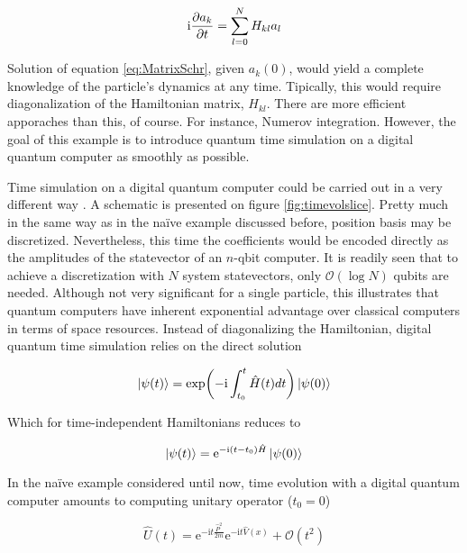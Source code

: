   \begin{equation}
    \mathrm{i}\pdv{a_k}{t} = \sum_{l = 0}^{N} H_{kl} a_l
    \label{eq:MatrixSchr}
  \end{equation}

  Solution of equation \ref{eq:MatrixSchr}, given $a_k(0)$, would yield a complete knowledge of the particle's dynamics at any time. Tipically, this would require diagonalization of the Hamiltonian matrix, $H_{kl}$. There are more efficient apporaches than this, of course. For instance, Numerov integration. However, the goal of this example is to introduce quantum time simulation on a digital quantum computer as smoothly as possible.

  Time simulation on a digital quantum computer could be carried out in a very different way \cite{Strini, Nielsen}. A schematic is presented on figure \ref{fig:timevolslice}. Pretty much in the same way as in the naïve example discussed before, position basis may be discretized. Nevertheless, this time the coefficients would be encoded directly as the amplitudes of the statevector of an $n$-qbit computer. It is readily seen that to achieve a discretization with $N$ system statevectors, only $\mathcal{O}(\log{N})$ qubits are needed. Although not very significant for a single particle, this illustrates that quantum computers have inherent exponential advantage over classical computers in terms of space resources. Instead of diagonalizing the Hamiltonian, digital quantum time simulation relies on the direct solution

  \begin{equation}
    \ket{\psi(t)} = \exp(-\mathrm{i}\int_{t_0}^t \hat{H}(t)dt)\ket{\psi(0)}
    \label{eq:UnitaryEvolution}
  \end{equation}

  Which for time-independent Hamiltonians reduces to

  \begin{equation}
    \ket{\psi(t)} = \mathrm{e}^{-\mathrm{i}(t - t_0) \hat{H}}\ket{\psi(0)}
    \label{eq:UnitaryEvolutionNoTime}
  \end{equation}

  In the naïve example considered until now, time evolution with a digital quantum computer amounts to computing unitary operator ($t_0 = 0$)

  \begin{equation}
    \hat{U}(t) = \mathrm{e}^{-\mathrm{i}t \frac{\hat{P}^2}{2m}}\mathrm{e}^{-\mathrm{i}t \hat{V}(x)} + \mathcal{O}(t^2)
  \end{equation}

